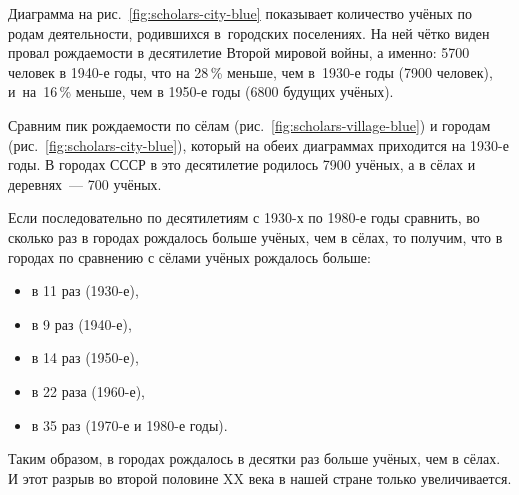 Диаграмма на рис.~\ref{fig:scholars-city-blue} показывает количество учёных по родам деятельности, родившихся в~городских поселениях.
На ней чётко виден провал рождаемости в десятилетие Второй мировой войны, 
а именно: 5700 человек в 1940-е годы, что на 28\,\% меньше, чем в~1930-е годы (7900 человек), 
и~на~16\,\% меньше, чем в 1950-е годы (6800 будущих учёных). 

Сравним пик рождаемости по сёлам (рис.~\ref{fig:scholars-village-blue}) 
                       и городам (рис.~\ref{fig:scholars-city-blue}), 
который на обеих диаграммах приходится на 1930-е годы. 
В городах СССР в это десятилетие родилось 7900 учёных, а в сёлах и деревнях~--- 700 учёных. 

Если последовательно по десятилетиям с 1930-х по 1980-е годы 
сравнить, во сколько раз в городах рождалось больше учёных, чем в сёлах, 
то получим, что в городах по сравнению с сёлами учёных рождалось больше:
\begin{itemize}[noitemsep,topsep=0pt]
  \item в 11 раз (1930-е), 
  \item в 9 раз (1940-е), 
  \item в 14 раз (1950-е), 
  \item в 22 раза (1960-е), 
  \item в 35 раз (1970-е и 1980-е годы).
\end{itemize}

Таким образом, в городах рождалось в десятки раз больше учёных, чем в сёлах. 
И этот разрыв во второй половине XX века в нашей стране только увеличивается. 
